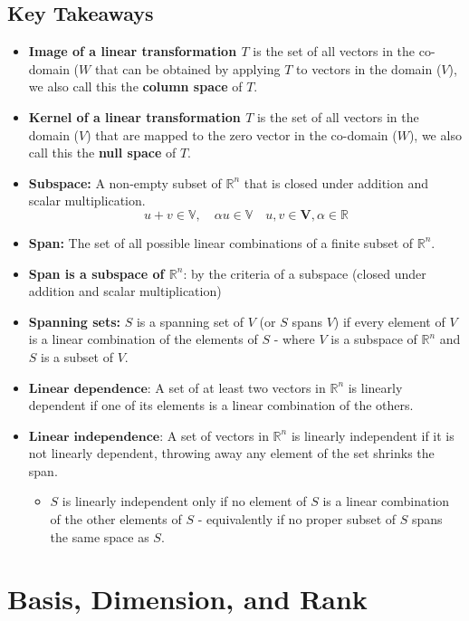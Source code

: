 \documentclass[a4paper, 9pt]{extarticle}
\begin{document}
\subsection{Key Takeaways}
\begin{takeaway-box}{}{}
\begin{itemize}
  \item \textbf{Image of a linear transformation $T$} is the set of all vectors in the co-domain ($W$ that can be obtained by applying $T$ to vectors in the domain ($V$), we also call this the \textbf{column space} of $T$.
  \item \textbf{Kernel of a linear transformation $T$} is the set of all vectors in the domain ($V$) that are mapped to the zero vector in the co-domain ($W$), we also call this the \textbf{null space} of $T$.
  \item \textbf{Subspace:} A non-empty subset of $\mathbb{R}^n$ that is closed under addition and scalar multiplication.
        $$u +v \in \mathbb{V}, \quad \alpha u \in \mathbb{V} \quad u, v \in \textbf{V}, \alpha \in \mathbb{R} $$
  \item \textbf{Span:} The set of all possible linear combinations of a finite subset of $\mathbb{R}^n$.
  \item \textbf{Span is a subspace of $\mathbb{R}^n$}: by the criteria of a subspace (closed under addition and scalar multiplication)
  \item \textbf{Spanning sets:} $S$ is a spanning set of $V$  (or $S$ spans $V$) if every element of $V$ is a linear combination of the elements of $S$ - where $V$ is a subspace of $\mathbb{R}^n$ and $S$ is a subset of $V$.
  \item $\textbf{Linear dependence}$: A set of at least two vectors in $\mathbb{R}^n$ is linearly dependent if one of its elements is a linear combination of the others.
  \item $\textbf{Linear independence}$: A set of vectors in $\mathbb{R}^n$ is linearly independent if it is not linearly dependent, throwing away any element of the set shrinks the span.
        \begin{itemize}
          \item $S$ is linearly independent only if no element of $S$ is a linear combination of the other elements of $S$ - equivalently if no proper subset of $S$ spans the same space as $S$.
        \end{itemize}
\end{itemize}
\end{takeaway-box}
\section{Basis, Dimension, and Rank}
\end{document}
